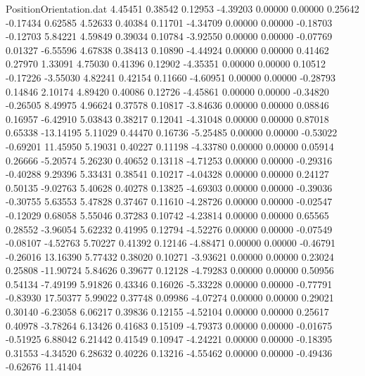 \begin{filecontents}{PositionOrientation.dat}
   4.45451    0.38542    0.12953    -4.39203    0.00000    0.00000    0.25642   -0.17434    0.62585
   4.52633    0.40384    0.11701    -4.34709    0.00000    0.00000   -0.18703   -0.12703    5.84221
   4.59849    0.39034    0.10784    -3.92550    0.00000    0.00000   -0.07769    0.01327   -6.55596
   4.67838    0.38413    0.10890    -4.44924    0.00000    0.00000    0.41462    0.27970    1.33091
   4.75030    0.41396    0.12902    -4.35351    0.00000    0.00000    0.10512   -0.17226   -3.55030
   4.82241    0.42154    0.11660    -4.60951    0.00000    0.00000   -0.28793    0.14846    2.10174
   4.89420    0.40086    0.12726    -4.45861    0.00000    0.00000   -0.34820   -0.26505    8.49975
   4.96624    0.37578    0.10817    -3.84636    0.00000    0.00000    0.08846    0.16957   -6.42910
   5.03843    0.38217    0.12041    -4.31048    0.00000    0.00000    0.87018    0.65338  -13.14195
   5.11029    0.44470    0.16736    -5.25485    0.00000    0.00000   -0.53022   -0.69201   11.45950
   5.19031    0.40227    0.11198    -4.33780    0.00000    0.00000    0.05914    0.26666   -5.20574
   5.26230    0.40652    0.13118    -4.71253    0.00000    0.00000   -0.29316   -0.40288    9.29396
   5.33431    0.38541    0.10217    -4.04328    0.00000    0.00000    0.24127    0.50135   -9.02763
   5.40628    0.40278    0.13825    -4.69303    0.00000    0.00000   -0.39036   -0.30755    5.63553
   5.47828    0.37467    0.11610    -4.28726    0.00000    0.00000   -0.02547   -0.12029    0.68058
   5.55046    0.37283    0.10742    -4.23814    0.00000    0.00000    0.65565    0.28552   -3.96054
   5.62232    0.41995    0.12794    -4.52276    0.00000    0.00000   -0.07549   -0.08107   -4.52763
   5.70227    0.41392    0.12146    -4.88471    0.00000    0.00000   -0.46791   -0.26016   13.16390
   5.77432    0.38020    0.10271    -3.93621    0.00000    0.00000    0.23024    0.25808  -11.90724
   5.84626    0.39677    0.12128    -4.79283    0.00000    0.00000    0.50956    0.54134   -7.49199
   5.91826    0.43346    0.16026    -5.33228    0.00000    0.00000   -0.77791   -0.83930   17.50377
   5.99022    0.37748    0.09986    -4.07274    0.00000    0.00000    0.29021    0.30140   -6.23058
   6.06217    0.39836    0.12155    -4.52104    0.00000    0.00000    0.25617    0.40978   -3.78264
   6.13426    0.41683    0.15109    -4.79373    0.00000    0.00000   -0.01675   -0.51925    6.88042
   6.21442    0.41549    0.10947    -4.24221    0.00000    0.00000   -0.18395    0.31553   -4.34520
   6.28632    0.40226    0.13216    -4.55462    0.00000    0.00000   -0.49436   -0.62676   11.41404

\end{filecontents}
